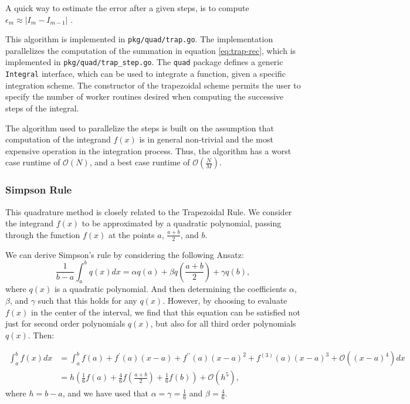 \documentclass[10pt, a4paper]{article}
\begin{document}
  A quick way to estimate the error after a given steps, is to compute $\epsilon_m \approx |I_m - I_{m-1}|$
  \cite{nr}.

  This algorithm is implemented in \texttt{pkg/quad/trap.go}. The implementation parallelizes the computation
  of the summation in equation \ref{eq:trap-rec}, which is implemented in \texttt{pkg/quad/trap\_step.go}.
  The \texttt{quad} package defines a generic \texttt{Integral} interface, which can be used to integrate
  a function, given a specific integration scheme. The constructor of the trapezoidal scheme permits the
  user to specify the number of worker routines desired when computing the successive steps of the integral.

  The algorithm used to parallelize the steps is built on the assumption that computation of the integrand
  $f(x)$ is in general non-trivial and the most expensive operation in the integration process. Thus, the
  algorithm has a worst case runtime of $\mathcal{O}(N)$, and a best case runtime of $\mathcal{O}(\frac{N}{M})$.

  \subsubsection{Simpson Rule}
  This quadrature method is closely related to the Trapezoidal Rule\footnotemark. We consider the integrand
  $f(x)$ to be approximated by a quadratic polynomial, passing through the function $f(x)$ at the points
  $a$, $\frac{a+b}{2}$, and $b$.


  We can derive Simpson's rule by considering the following Ansatz:
  \begin{equation}
  \frac{1}{b-a} \int_a^b q(x) dx = \alpha q(a) + \beta q(\frac{a+b}{2}) + \gamma q(b),
  \end{equation}
  where $q(x)$ is a quadratic polynomial. And then determining the coefficients $\alpha$, $\beta$, and $\gamma$
  such that this holds for any $q(x)$. However, by choosing to evaluate $f(x)$ in the center of the interval,
  we find that this equation can be satisfied not just for second order polynomials $q(x)$, but also
  for all third order polynomials $q(x)$. Then:

  \begin{equation}
  \begin{split}
  \int_a^b f(x) dx &= \int_a^b f(a) + f^\prime(a) (x-a) + f^{\prime\prime}(a) (x-a)^2 + f^{(3)}(a) (x-a)^3 + \mathcal{O}\left((x-a)^4\right) dx \\
  &= h \left( \frac{1}{6} f(a) + \frac{4}{6} f(\frac{a+b}{2}) + \frac{1}{6} f(b) \right) + \mathcal{O}(h^5),
  \end{split}
  \end{equation}
  where $h = b-a$, and we have used that $\alpha = \gamma = \frac{1}{6}$ and $\beta = \frac{4}{6}$.
\end{document}
